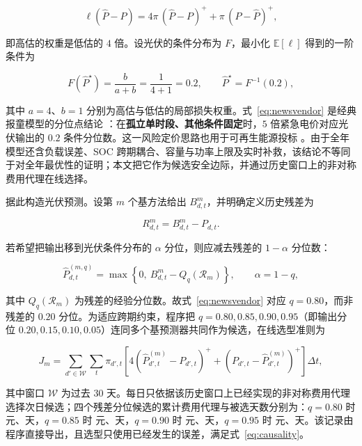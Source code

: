 \begin{equation}
	\ell(\hat P-P)=4\pi\,(\hat P-P)^{+}+\pi\,(P-\hat P)^{+},
	\label{eq:asymmetric-loss}
\end{equation}

即高估的权重是低估的 $4$ 倍。设光伏的条件分布为 $F$，最小化 $\mathbb E[\ell]$ 得到的一阶条件为

\begin{equation}
	F(\hat P^{\star})=\frac{b}{a+b}=\frac{1}{4+1}=0.2 ,
	\qquad \hat P^{\star}=F^{-1}(0.2),
	\label{eq:newsvendor}
\end{equation}

其中 $a=4$、$b=1$ 分别为高估与低估的局部损失权重。式~\eqref{eq:newsvendor} 是经典报童模型的分位点结论 \cite{qin2011newsvendor}：在\textbf{孤立单时段、其他条件固定}时，$5$ 倍紧急电价对应光伏输出的 $0.2$ 条件分位数。这一风险定价思路也用于可再生能源投标 \cite{polat2024renewable}。由于全年模型还含负载误差、SOC 跨期耦合、容量与功率上限及实时补救，该结论不等同于对全年最优性的证明；本文把它作为候选安全边际，并通过历史窗口上的非对称费用代理在线选择。

据此构造光伏预测。设第 $m$ 个基方法给出 $B^m_{d,t}$，并明确定义历史残差为

\begin{equation}
	R^m_{d,t}=B^m_{d,t}-P_{d,t}.
	\label{eq:pv-residual}
\end{equation}

若希望把输出移到光伏条件分布的 $\alpha$ 分位，则应减去残差的 $1-\alpha$ 分位数：

\begin{equation}
	\hat P^{(m,q)}_{d,t}=\max\left\{0,\ B^{m}_{d,t}-Q_{q}\!\left(\mathcal R_m\right)\right\},
	\qquad \alpha=1-q,
	\label{eq:pv-forecast}
\end{equation}

其中 $Q_q(\mathcal R_m)$ 为残差的经验分位数。故式~\eqref{eq:newsvendor} 对应 $q=0.80$，而非残差的 $0.20$ 分位。为适应跨期约束，程序把 $q=0.80,0.85,0.90,0.95$（即输出分位 $0.20,0.15,0.10,0.05$）连同多个基预测器共同作为候选，在线选型准则为

\begin{equation}
	J_m=\sum_{d'\in\mathcal W}\sum_{t}\pi_{d',t}
	\left[4\left(\hat P^{(m)}_{d',t}-P_{d',t}\right)^{+}
	+\left(P_{d',t}-\hat P^{(m)}_{d',t}\right)^{+}\right]\Delta t ,
	\label{eq:pv-score}
\end{equation}

其中窗口 $\mathcal W$ 为过去 $30$ 天。每日只依据该历史窗口上已经实现的非对称费用代理选择次日候选；四个残差分位候选的累计费用代理与被选天数分别为：$q=0.80$ 时 \PvQuantEightyScore 元、\PvQuantEightyDays 天，$q=0.85$ 时 \PvQuantEightyFiveScore 元、\PvQuantEightyFiveDays 天，$q=0.90$ 时 \PvQuantNinetyScore 元、\PvQuantNinetyDays 天，$q=0.95$ 时 \PvQuantNinetyFiveScore 元、\PvQuantNinetyFiveDays 天。该记录由程序直接导出，且选型只使用已经发生的误差，满足式~\eqref{eq:causality}。

